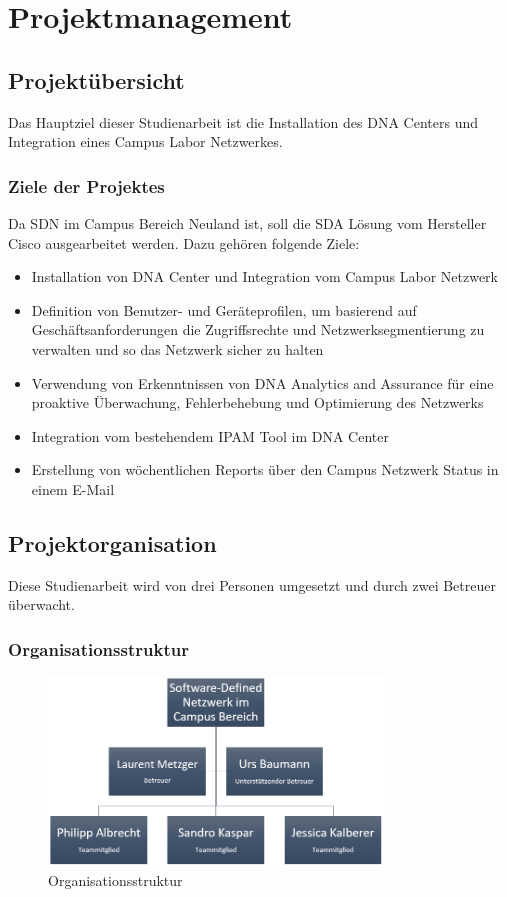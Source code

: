 \section{Projektmanagement}

\subsection{Projektübersicht}
Das Hauptziel dieser Studienarbeit ist die Installation des DNA Centers und Integration eines Campus Labor Netzwerkes.

\subsubsection{Ziele der Projektes}
Da SDN im Campus Bereich Neuland ist, soll die SDA Lösung vom Hersteller Cisco ausgearbeitet werden. Dazu gehören folgende Ziele:

\begin{itemize}
	\item Installation von DNA Center und Integration vom Campus Labor Netzwerk
	\item Definition von Benutzer- und Geräteprofilen, um basierend auf Geschäftsanforderungen die Zugriffsrechte und Netzwerksegmentierung zu verwalten und so das Netzwerk sicher zu halten
	\item Verwendung von Erkenntnissen von DNA Analytics and Assurance für eine proaktive Überwachung, Fehlerbehebung und Optimierung des Netzwerks
	\item Integration vom bestehendem IPAM Tool im DNA Center
	\item Erstellung von wöchentlichen Reports über den Campus Netzwerk Status in einem E-Mail 
\end{itemize}

\subsection{Projektorganisation}
Diese Studienarbeit wird von drei Personen umgesetzt und durch zwei Betreuer überwacht.

\subsubsection{Organisationsstruktur}
\begin{figure}[H]
	\centering
	\includegraphics[height=5cm]{img/Organisationsstruktur.png}
	\caption{Organisationsstruktur}
	\label{fig:Organisationsstruktur}
\end{figure}

